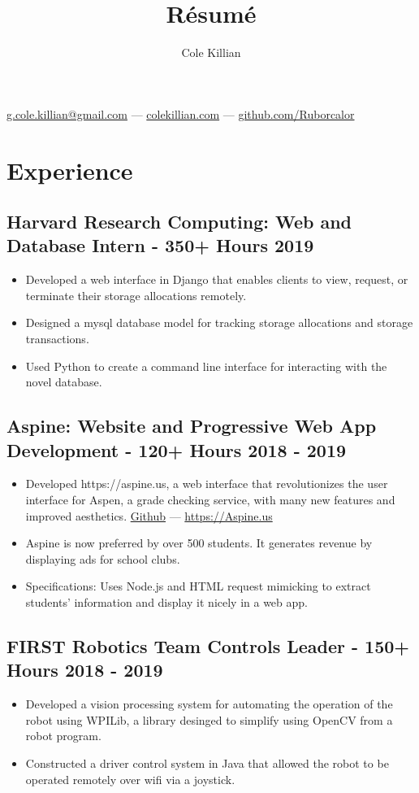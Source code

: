 \documentclass{article}
\makeatletter
\renewcommand{\maketitle}{
\begin{center}
{\color{green}\huge\bfseries
\theauthor}

\vspace{.25em}
\href{mailto:g.cole.killian@gmail.com}{g.cole.killian@gmail.com} --- \href{https://colekillian.com}{colekillian.com} --- \href{https://github.com/Ruborcalor}{github.com/Ruborcalor} 
\end{center}
}
\makeatother
\begin{document}
\title{R\'esum\'e}
\author{Cole Killian}

\maketitle

\section{Experience}

\subsection{Harvard Research Computing: Web and Database Intern - 350+ Hours \hfill 2019}
\begin{itemize}[leftmargin=0.5in]
  \setlength\itemsep{0.00em}
  \item Developed a web interface in Django that enables clients to view, request, or terminate their storage allocations remotely.
  \item Designed a mysql database model for tracking storage allocations and storage transactions.
  \item Used Python to create a command line interface for interacting with the novel database.
\end{itemize}

\subsection{Aspine: Website and Progressive Web App Development - 120+ Hours \hfill 2018 - 2019}
\begin{itemize}[leftmargin=0.5in]
  \setlength\itemsep{0.00em}
  \item Developed https://aspine.us, a web interface that revolutionizes the user interface for Aspen, a grade checking service, with many new features and improved aesthetics. \href{https://github.com/Aspine/aspine}{Github} --- \href{https://aspine.us}{https://Aspine.us}
  \item Aspine is now preferred by over 500 students. It generates revenue by displaying ads for school clubs.
  \item Specifications: Uses Node.js and HTML request mimicking to extract students’ information and display it nicely in a web app.
\end{itemize}

\subsection{FIRST Robotics Team Controls Leader - 150+ Hours \hfill 2018 - 2019}
\begin{itemize}[leftmargin=0.5in]
  \setlength\itemsep{0.00em}
  \item Developed a vision processing system for automating the operation of the robot using WPILib, a library desinged to simplify using OpenCV from a robot program.
  \item Constructed a driver control system in Java that allowed the robot to be operated remotely over wifi via a joystick.
\end{itemize}
\end{document}
